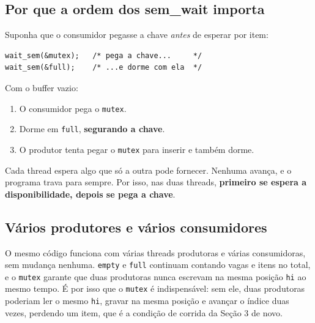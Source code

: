 \documentclass[11pt,a4paper]{article}
\newcommand{\cmd}[1]{\texttt{#1}}
\begin{document}
\subsection{Por que a ordem dos sem\_wait importa}

Suponha que o consumidor pegasse a chave \emph{antes} de esperar por item:

\begin{lstlisting}[style=codigo]
wait_sem(&mutex);   /* pega a chave...     */
wait_sem(&full);    /* ...e dorme com ela  */
\end{lstlisting}

Com o buffer vazio:

\begin{enumerate}
    \item O consumidor pega o \cmd{mutex}.
    \item Dorme em \cmd{full}, \textbf{segurando a chave}.
    \item O produtor tenta pegar o \cmd{mutex} para inserir e também dorme.
\end{enumerate}

\begin{center}
\end{center}

\begin{alerta}[Deadlock]
Cada thread espera algo que só a outra pode fornecer. Nenhuma avança, e o programa trava para sempre. Por isso, nas duas threads, \textbf{primeiro se espera a disponibilidade, depois se pega a chave}.
\end{alerta}

\subsection{Vários produtores e vários consumidores}

O mesmo código funciona com várias threads produtoras e várias consumidoras, sem mudança nenhuma. \cmd{empty} e \cmd{full} continuam contando vagas e itens no total, e o \cmd{mutex} garante que duas produtoras nunca escrevam na mesma posição \cmd{hi} ao mesmo tempo. É por isso que o \cmd{mutex} é indispensável: sem ele, duas produtoras poderiam ler o mesmo \cmd{hi}, gravar na mesma posição e avançar o índice duas vezes, perdendo um item, que é a condição de corrida da Seção 3 de novo.
\end{document}
